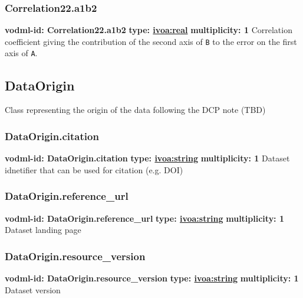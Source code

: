     \subsubsection{Correlation22.a1b2}
      \textbf{vodml-id: Correlation22.a1b2} \newline
      \textbf{type: \hyperref[sect:ivoa]{ivoa:real}} \newline
      \textbf{multiplicity: 1} \newline 
      Correlation coefficient giving the contribution of the second axis of \texttt{B} to the error on the first axis of \texttt{A}.

  \subsection{DataOrigin}
  \label{sect:DataOrigin}
    Class representing the origin of the data following the DCP note (TBD)

    \subsubsection{DataOrigin.citation}
      \textbf{vodml-id: DataOrigin.citation} \newline
      \textbf{type: \hyperref[sect:ivoa]{ivoa:string}} \newline
      \textbf{multiplicity: 1} \newline 
      Dataset idnetifier that can be used for citation (e.g. DOI)

    \subsubsection{DataOrigin.reference_url}
      \textbf{vodml-id: DataOrigin.reference_url} \newline
      \textbf{type: \hyperref[sect:ivoa]{ivoa:string}} \newline
      \textbf{multiplicity: 1} \newline 
      Dataset landing page

    \subsubsection{DataOrigin.resource_version}
      \textbf{vodml-id: DataOrigin.resource_version} \newline
      \textbf{type: \hyperref[sect:ivoa]{ivoa:string}} \newline
      \textbf{multiplicity: 1} \newline 
      Dataset version

